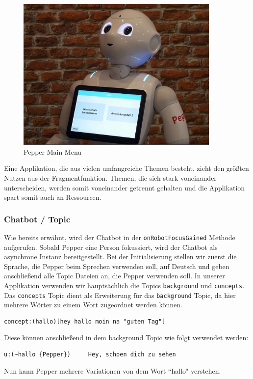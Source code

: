 \begin{figure}[H]
    \centering
    \includegraphics[width=10cm]{Figures/AppChapter/rx1.JPG}
    \caption{Pepper Main Menu}
    \label{fig:Mainmenu}
    \centering
\end{figure}

Eine Applikation, die aus vielen umfangreiche Themen besteht, zieht den größten Nutzen aus der Fragmentfunktion. Themen, die sich stark voneinander 
unterscheiden, werden somit voneinander getrennt gehalten und die Applikation spart somit auch an Ressourcen.\\

\subsubsection{Chatbot / Topic} 

Wie bereits erwähnt, wird der Chatbot in der \verb|onRobotFocusGained| Methode aufgerufen. Sobald Pepper eine Person fokussiert, wird der 
Chatbot als asynchrone Instanz bereitgestellt. Bei der Initialisierung stellen wir zuerst die Sprache, die Pepper beim Sprechen verwenden soll, 
auf Deutsch und geben anschließend alle Topic Dateien an, die Pepper verwenden soll. In unserer Applikation verwenden wir hauptsächlich die Topics 
\verb|background| und \verb|concepts|. Das \verb|concepts| Topic dient als Erweiterung für das \verb|background| 
Topic, da hier mehrere Wörter zu einem Wort zugeordnet werden können.\\
\begin{lstlisting}
concept:(hallo)[hey hallo moin na "guten Tag"]
\end{lstlisting}
Diese können anschließend in dem background Topic wie folgt verwendet werden:\\
\begin{lstlisting}
u:(~hallo {Pepper}) 	Hey, schoen dich zu sehen
\end{lstlisting}
Nun kann Pepper mehrere Variationen von dem Wort ``hallo" verstehen.


